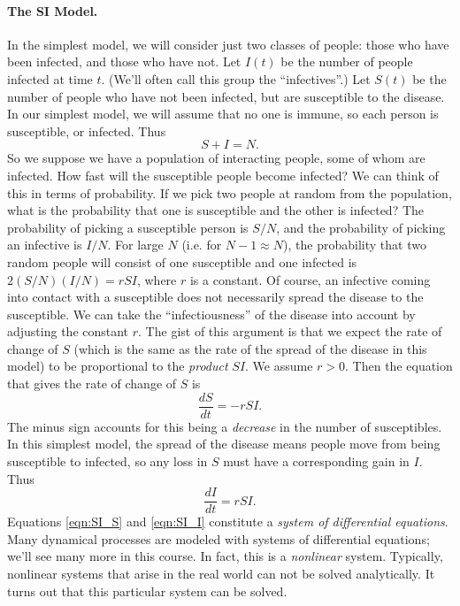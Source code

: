 \documentclass[reqno]{immbook}
\begin{document}
\paragraph{The SI Model.}
In the simplest model, we will consider just two classes
of people: those who have been infected, and those who have
not.
Let $I(t)$ be the number of people infected at time $t$.
(We'll often call this group the ``infectives''.)
Let $S(t)$ be the number of people who have not
been infected, but are susceptible to the disease.
In our simplest model, we will assume that no one is immune,
so each person is susceptible, or infected.  Thus
\[
   S+I = N.
\]
So we suppose we have a population of interacting people,
some of whom are infected.  How fast will the susceptible
people become infected?  We can think of this in terms
of probability.  If we pick two people at random from
the population, what is the probability that one is
susceptible and the other is infected? The probability
of picking a susceptible person is $S/N$, and the probability
of picking an infective is $I/N$.  For large $N$ (i.e. for
$N-1\approx N$), the probability that two random
people will consist of one susceptible and one infected
is $2(S/N)(I/N) = rSI$, where $r$ is a constant.
Of course, an infective coming into contact
with a susceptible does not necessarily spread the disease
to the susceptible.
We can take the ``infectiousness'' of the disease into
account by adjusting the constant $r$.
The gist of this argument is that we expect the rate
of change of $S$ (which is the same as the rate of
the spread of the disease in this model) to be proportional
to the \emph{product} $SI$.
We assume $r>0$.  Then the equation that gives the
rate of change of $S$ is
\begin{equation}
  \frac{dS}{dt} = -r S I.
\label{eqn:SI_S}
\end{equation}
The minus sign accounts for this being a \emph{decrease}
in the number of susceptibles.
In this simplest model, the spread of the disease
means people move from being susceptible to
infected, so any loss in $S$ must have a corresponding
gain in $I$.  Thus
\begin{equation}
  \frac{dI}{dt} = r S I.
\label{eqn:SI_I}
\end{equation}
Equations \eqref{eqn:SI_S} and \eqref{eqn:SI_I}
constitute a \emph{system of differential equations}.
Many dynamical processes are modeled with systems of differential
equations; we'll see many more in this course.
In fact, this is a \emph{nonlinear} system.
Typically, nonlinear systems
that arise in the real world can not be solved analytically.
It turns out that this particular system can be solved.
\end{document}
